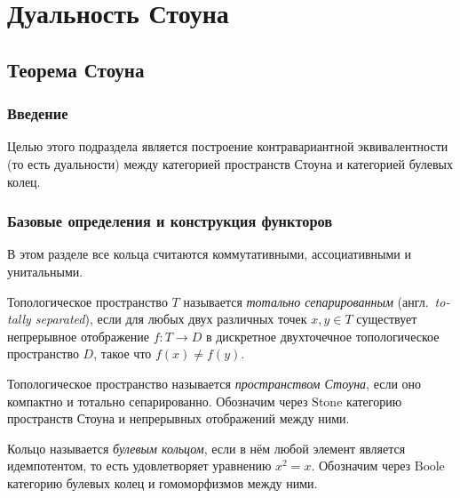 \documentclass[
	extrafontsizes,
	11pt,
	hyphens,
]{memoir}
\begin{document}
\section{Дуальность Стоуна}

\subsection{Теорема Стоуна}

\subsubsection{Введение}

Целью этого подраздела является построение контравариантной эквивалентности (то есть дуальности) между категорией пространств Стоуна и категорией булевых колец.

\subsubsection{Базовые определения и конструкция функторов}

\begin{convention}
В этом разделе все кольца считаются коммутативными, ассоциативными и унитальными.
\end{convention}

\begin{definition}
Топологическое пространство $T$ называется \emph{тотально сепарированным} (англ.\ \textenglish{\emph{totally separated}}), если для любых двух различных точек $x,y \in T$ существует непрерывное отображение $f: T \to D$ в дискретное двухточечное топологическое пространство $D$, такое что $f(x) \neq f(y)$.
\end{definition}

\begin{definition}
Топологическое пространство называется \emph{пространством Стоуна}, если оно компактно и тотально сепарированно.
Обозначим через $\mathrm{Stone}$ категорию пространств Стоуна и непрерывных отображений между ними.
\end{definition}

\begin{definition}
Кольцо называется \emph{булевым кольцом}, если в нём любой элемент является идемпотентом, то есть удовлетворяет уравнению $x^2=x$.
Обозначим через $\mathrm{Boole}$ категорию булевых колец и гомоморфизмов между ними.
\end{definition}
\end{document}
